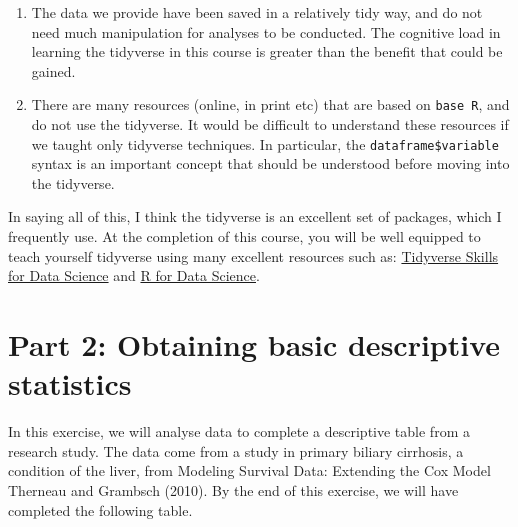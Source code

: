 \documentclass[
  a4paper,
]{memoir}
\providecommand{\tightlist}{%
  \setlength{\itemsep}{0pt}\setlength{\parskip}{0pt}}\usepackage{longtable,booktabs,array}
\begin{document}
\begin{enumerate}
\def\labelenumi{\arabic{enumi}.}
\tightlist
\item
  The data we provide have been saved in a relatively tidy way, and do
  not need much manipulation for analyses to be conducted. The cognitive
  load in learning the tidyverse in this course is greater than the
  benefit that could be gained.
\item
  There are many resources (online, in print etc) that are based on
  \texttt{base\ R}, and do not use the tidyverse. It would be difficult
  to understand these resources if we taught only tidyverse techniques.
  In particular, the \texttt{dataframe\$variable} syntax is an important
  concept that should be understood before moving into the tidyverse.
\end{enumerate}

In saying all of this, I think the tidyverse is an excellent set of
packages, which I frequently use. At the completion of this course, you
will be well equipped to teach yourself tidyverse using many excellent
resources such as:
\href{https://jhudatascience.org/tidyversecourse/}{Tidyverse Skills for
Data Science} and \href{https://r4ds.had.co.nz/}{R for Data Science}.

\hypertarget{part-2-obtaining-basic-descriptive-statistics-1}{%
\section{Part 2: Obtaining basic descriptive
statistics}\label{part-2-obtaining-basic-descriptive-statistics-1}}

In this exercise, we will analyse data to complete a descriptive table
from a research study. The data come from a study in primary biliary
cirrhosis, a condition of the liver, from Modeling Survival Data:
Extending the Cox Model Therneau and Grambsch (2010). By the end of this
exercise, we will have completed the following table.

 
  \providecommand{\huxb}[2]{\arrayrulecolor[RGB]{#1}\global\arrayrulewidth=#2pt}
  \providecommand{\huxvb}[2]{\color[RGB]{#1}\vrule width #2pt}
  \providecommand{\huxtpad}[1]{\rule{0pt}{#1}}
  \providecommand{\huxbpad}[1]{\rule[-#1]{0pt}{#1}}
\end{document}
